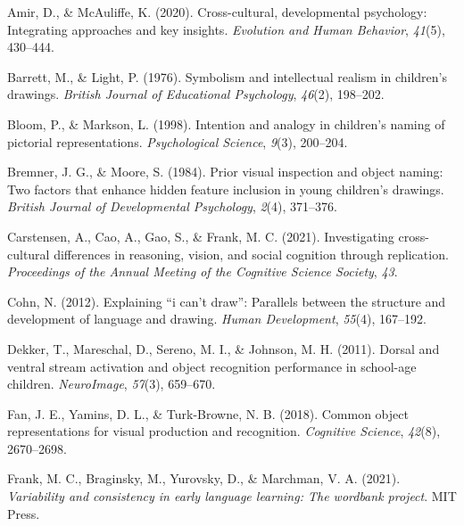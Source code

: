 \documentclass[
  man]{apa6}
\newlength{\cslhangindent}
\newlength{\cslentryspacingunit} %
\newenvironment{CSLReferences}[2] %
 {%
  \setlength{\parindent}{0pt}
  \ifodd #1
  \let\oldpar\par
  \def\par{\hangindent=\cslhangindent\oldpar}
  \fi
  \setlength{\parskip}{#2\cslentryspacingunit}
 }%
 {}
\begin{document}
\endgroup

\hypertarget{refs}{}
\begin{CSLReferences}{1}{0}
\leavevmode{}%
Amir, D., \& McAuliffe, K. (2020). Cross-cultural, developmental psychology: Integrating approaches and key insights. \emph{Evolution and Human Behavior}, \emph{41}(5), 430--444.

\leavevmode{}%
Barrett, M., \& Light, P. (1976). Symbolism and intellectual realism in children's drawings. \emph{British Journal of Educational Psychology}, \emph{46}(2), 198--202.

\leavevmode{}%
Bloom, P., \& Markson, L. (1998). Intention and analogy in children's naming of pictorial representations. \emph{Psychological Science}, \emph{9}(3), 200--204.

\leavevmode{}%
Bremner, J. G., \& Moore, S. (1984). Prior visual inspection and object naming: Two factors that enhance hidden feature inclusion in young children's drawings. \emph{British Journal of Developmental Psychology}, \emph{2}(4), 371--376.

\leavevmode{}%
Carstensen, A., Cao, A., Gao, S., \& Frank, M. C. (2021). Investigating cross-cultural differences in reasoning, vision, and social cognition through replication. \emph{Proceedings of the Annual Meeting of the Cognitive Science Society}, \emph{43}.

\leavevmode{}%
Cohn, N. (2012). Explaining {``i can't draw''}: Parallels between the structure and development of language and drawing. \emph{Human Development}, \emph{55}(4), 167--192.

\leavevmode{}%
Dekker, T., Mareschal, D., Sereno, M. I., \& Johnson, M. H. (2011). Dorsal and ventral stream activation and object recognition performance in school-age children. \emph{NeuroImage}, \emph{57}(3), 659--670.

\leavevmode{}%
Fan, J. E., Yamins, D. L., \& Turk-Browne, N. B. (2018). Common object representations for visual production and recognition. \emph{Cognitive Science}, \emph{42}(8), 2670--2698.

\leavevmode{}%
Frank, M. C., Braginsky, M., Yurovsky, D., \& Marchman, V. A. (2021). \emph{Variability and consistency in early language learning: The wordbank project}. MIT Press.


\end{CSLReferences}
\end{document}
